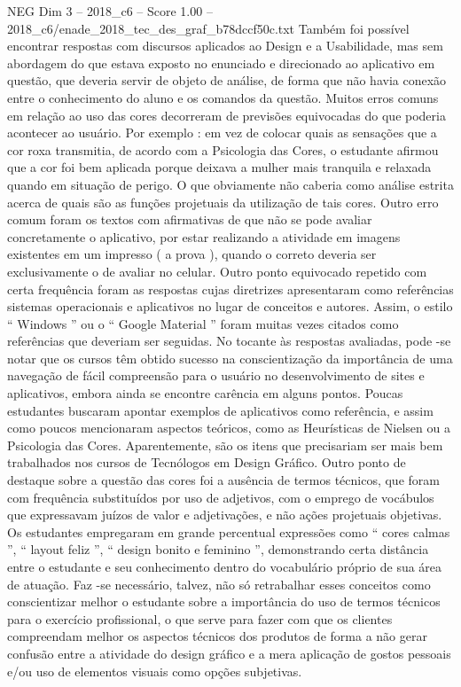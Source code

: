 \begin{textsample}{NEG Dim 3 – 2018\_c6 – Score 1.00 – 2018\_c6/enade\_2018\_tec\_des\_graf\_b78dccf50c.txt}
Também foi possível encontrar respostas com discursos aplicados ao Design e a Usabilidade, mas sem abordagem do que estava exposto no enunciado e direcionado ao aplicativo em questão, que deveria servir de objeto de análise, de forma que não havia conexão entre o conhecimento do aluno e os comandos da questão.
Muitos erros comuns em relação ao uso das cores decorreram de previsões equivocadas do que poderia acontecer ao usuário.
Por exemplo : em vez de colocar quais as sensações que a cor roxa transmitia, de acordo com a Psicologia das Cores, o estudante afirmou que a cor foi bem aplicada porque deixava a mulher mais tranquila e relaxada quando em situação de perigo.
O que obviamente não caberia como análise estrita acerca de quais são as funções projetuais da utilização de tais cores.
Outro erro comum foram os textos com afirmativas de que não se pode avaliar concretamente o aplicativo, por estar realizando a atividade em imagens existentes em um impresso ( a prova ), quando o correto deveria ser exclusivamente o de avaliar no celular.
Outro ponto equivocado repetido com certa frequência foram as respostas cujas diretrizes apresentaram como referências sistemas operacionais e aplicativos no lugar de conceitos e autores.
Assim, o estilo “ Windows ” ou o “ Google Material ” foram muitas vezes citados como referências que deveriam ser seguidas.
No tocante às respostas avaliadas, pode -se notar que os cursos têm obtido sucesso na conscientização da importância de uma navegação de fácil compreensão para o usuário no desenvolvimento de sites e aplicativos, embora ainda se encontre carência em alguns pontos.
Poucas estudantes buscaram apontar exemplos de aplicativos como referência, e assim como poucos mencionaram aspectos teóricos, como as Heurísticas de Nielsen ou a Psicologia das Cores.
Aparentemente, são os itens que precisariam ser mais bem trabalhados nos cursos de Tecnólogos em Design Gráfico.
Outro ponto de destaque sobre a questão das cores foi a ausência de termos técnicos, que foram com frequência substituídos por uso de adjetivos, com o emprego de vocábulos que expressavam juízos de valor e adjetivações, e não ações projetuais objetivas.
Os estudantes empregaram em grande percentual expressões como “ cores calmas ”, “ layout feliz ”, “ design bonito e feminino ”, demonstrando certa distância entre o estudante e seu conhecimento dentro do vocabulário próprio de sua área de atuação.
Faz -se necessário, talvez, não só retrabalhar esses conceitos como conscientizar melhor o estudante sobre a importância do uso de termos técnicos para o exercício profissional, o que serve para fazer com que os clientes compreendam melhor os aspectos técnicos dos produtos de forma a não gerar confusão entre a atividade do design gráfico e a mera aplicação de gostos pessoais e/ou uso de elementos visuais como opções subjetivas.

\end{textsample}
